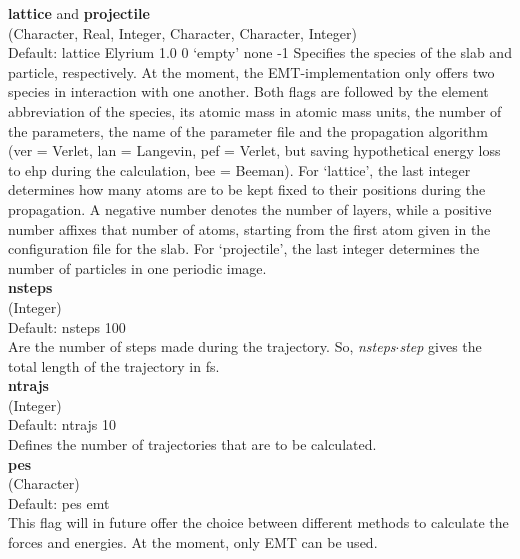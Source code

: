 \documentclass[twoside, 11pt, titlepage, captions=nooneline, a4paper, headsepline]{scrbook}%
\newcommand{\9}{\mathrm}
\newcommand{\0}{\,\mathrm}
\begin{document}
\noindent\textbf{lattice} and \textbf{projectile}\\ 
(Character, Real, Integer, Character, Character, Integer)\\ 
Default: lattice Elyrium 1.0 0 `empty' none -1
Specifies the species of the slab and particle, respectively. At the moment, the EMT-implementation only offers two species in interaction with one another. Both flags are followed by the element abbreviation of the species, its atomic mass in atomic mass units, the number of the parameters, the name of the parameter file and the propagation algorithm (ver = Verlet, lan = Langevin, pef = Verlet, but saving hypothetical energy loss to ehp during the calculation, bee = Beeman). For `lattice', the last integer determines how many atoms are to be kept fixed to their positions during the propagation. A negative number denotes the number of layers, while a positive number affixes that number of atoms, starting from the first atom given in the configuration file for the slab. For `projectile', the last integer determines the number of particles in one periodic image.\\

\noindent\textbf{nsteps}\\(Integer)\\
Default: nsteps 100\\
Are the number of steps made during the trajectory. So, \textit{nsteps}$\cdot$\textit{step} gives the total length of the trajectory in fs.\\

\noindent\textbf{ntrajs}\\
(Integer)\\
Default: ntrajs 10\\
Defines the number of trajectories that are to be calculated.\\

\noindent\textbf{pes}\\
(Character)\\
Default: pes emt\\
This flag will in future offer the choice between different methods to calculate the forces and energies. At the moment, only EMT can be used.\\
\end{document}
